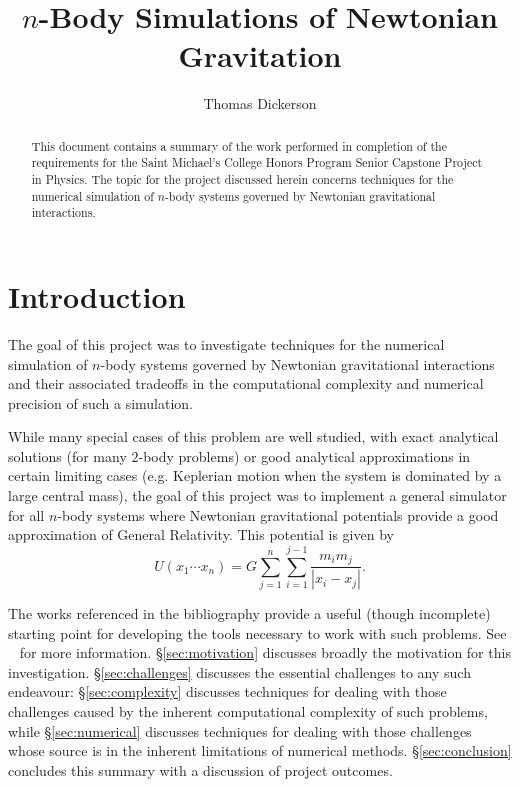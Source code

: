 \documentclass[10pt,twocolumn]{article}
\title{$n$-Body Simulations of Newtonian Gravitation}
\author{Thomas Dickerson}
\begin{document}
    \maketitle

    \begin{abstract}
    This document contains a summary of the work performed in completion of the requirements for the Saint Michael's
	College Honors Program Senior Capstone Project in Physics. The topic for the project discussed herein concerns
	techniques for the numerical simulation of $n$-body systems governed by Newtonian gravitational interactions.
    \end{abstract}
     
    \section{Introduction}
	\label{sec:introduction}
	The goal of this project was to investigate techniques for the numerical simulation of $n$-body systems governed by
	Newtonian gravitational interactions and their associated tradeoffs in the computational complexity and numerical precision
	of such a simulation.
	
	While many special cases of this problem are well studied, with exact analytical solutions (for many $2$-body problems)
	or good analytical approximations in certain limiting cases  (e.g. Keplerian motion when the system is dominated by a large central mass),
	the goal of this project was to implement a general simulator for all $n$-body systems where Newtonian gravitational potentials provide a
	good approximation of General Relativity. This potential is given by
	\begin{equation}
	U(x_{1} \cdots x_{n}) = G \sum^{n}_{j=1} \sum^{j-1}_{i=1} \frac{m_{i} m_{j}}{\left|x_{i} - x_{j}\right|}.
	\end{equation}
	
	The works referenced in the bibliography provide a useful (though incomplete) starting point for developing the tools necessary
	to work with such problems. See ~\cite{AbiaSanzSerna,BarnesHut,Brizard,SODEII,McLachlanAtela} for more information. \S\ref{sec:motivation}
	discusses broadly the motivation for this investigation. \S\ref{sec:challenges} discusses the essential challenges to any such endeavour:
	\S\ref{sec:complexity} discusses techniques for dealing with those challenges caused by the inherent computational complexity of
	such problems, while \S\ref{sec:numerical} discusses techniques for dealing with those challenges whose source is in the inherent limitations
	of numerical methods. \S\ref{sec:conclusion}
	concludes this summary with a discussion of project outcomes.
	
\end{document}
